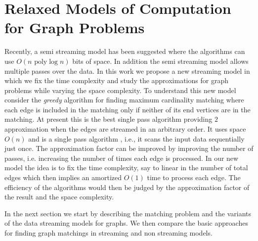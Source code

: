 \documentclass{scrartcl}
\begin{document}
\section{Relaxed Models of Computation for Graph Problems}
%

Recently, a semi streaming model has been suggested where the algorithms can use $O(n \text{ poly} \log n)$ bits of space. In addition the semi streaming model allows multiple passes over the data.  In this work we propose a new streaming model in which we fix the time complexity and study the approximations for graph problems while varying the space complexity. To understand this new model consider the \emph{greedy} algorithm for finding maximum cardinality matching where each edge is included in the matching only if neither of its end vertices are in the matching. At present this is the best single pass algorithm providing $2$ approximation when the edges are streamed in an arbitrary order. It uses space $O(n)$ and is a single pass algorithm , i.e., it scans the input data sequentially just once. The approximation factor can be improved by improving the number of passes, i.e. increasing the number of times each edge is processed. In our new model the idea is to fix the time complexity, say to linear in the number of total edges which then implies an amortized $O(1)$ time to process each edge. The efficiency of the algorithms would then be judged by the approximation factor of the result and the space complexity.  

In the next section we start by describing the matching problem and the variants of the data streaming models for graphs. We then compare the basic approaches for finding graph matchings in streaming and non streaming models.
\end{document}
